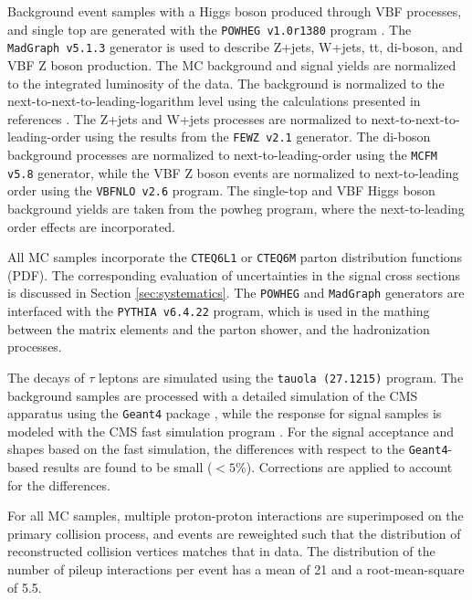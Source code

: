 Background event samples with a Higgs boson produced through VBF processes, and single top are generated with the \texttt{POWHEG v1.0r1380} program \cite{Frixione:2007vw}. 
The \texttt{MadGraph v5.1.3} generator is used to describe Z+jets, W+jets, tt, di-boson, and VBF Z boson production. The MC background and signal yields are normalized to the integrated luminosity of the data. 
The \ttbar background is normalized to the next-to-next-to-leading-logarithm level using the calculations presented in references \cite{Czakon:2013goa,Melnikov:2006kv}. 
The Z+jets and W+jets processes are normalized to next-to-next-to-leading-order using the results from the \texttt{FEWZ v2.1} \cite{Gavin:2010az} generator. 
The di-boson background processes are normalized to next-to-leading-order using the \texttt{MCFM v5.8} \cite{Campbell:2010ff} generator, while the VBF Z boson events are normalized to next-to-leading order using the \texttt{VBFNLO v2.6} \cite{Arnold:2008rz,Arnold:2011wj}program. 
The single-top and VBF Higgs boson background yields are taken from the powheg program, where the next-to-leading order effects are incorporated.

All MC samples incorporate the \texttt{CTEQ6L1} \cite{Pumplin:2002vw} or \texttt{CTEQ6M} \cite{Nadolsky:2008zw} parton distribution functions (PDF). The corresponding evaluation of uncertainties in the signal cross sections is discussed in Section \ref{sec:systematics}. The \texttt{POWHEG} and \texttt{MadGraph} generators are interfaced with the \texttt{PYTHIA v6.4.22} \cite{Sjostrand:2006za} program, which is used in the mathing between the matrix elements and the parton shower, and the hadronization processes. 


The decays of $\tau$ leptons are simulated using the \texttt{tauola (27.1215)} \cite{Davidson:2010rw} program. The background samples are processed with a detailed simulation of the CMS apparatus using the \texttt{Geant4} package \cite{Agostinelli:2002hh}, while the response for signal samples is modeled with the CMS fast simulation program \cite{Abdullin:2011zz}. For the signal acceptance and \mjj shapes based on the fast simulation, the differences with respect to the \texttt{Geant4}-based results are found to be small ($< 5\%$). Corrections are applied to account for the differences. 

For all MC samples, multiple proton-proton interactions are superimposed on the primary collision process, and events are reweighted such that the distribution of reconstructed collision vertices matches that in data. The distribution of the number of pileup interactions per event has a mean of 21 and a root-mean-square of 5.5. 

